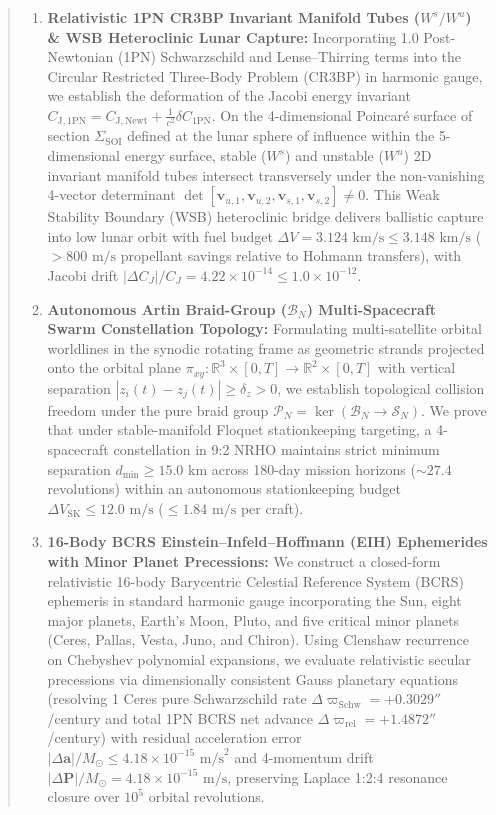 \documentclass[11pt,a4paper,reqno]{article}
\theoremstyle{plain}
\theoremstyle{definition}
\theoremstyle{remark}
\numberwithin{equation}{section}
\begin{document}
\begin{abstract}
\begin{enumerate}[label=\textbf{(\roman*)}, leftmargin=2.2em]
  \item \textbf{Relativistic 1PN CR3BP Invariant Manifold Tubes ($W^s / W^u$) \& WSB Heteroclinic Lunar Capture:} Incorporating 1.0 Post-Newtonian (1PN) Schwarzschild and Lense--Thirring terms into the Circular Restricted Three-Body Problem (CR3BP) in harmonic gauge, we establish the deformation of the Jacobi energy invariant $C_{\mathrm{J, 1PN}} = C_{\mathrm{J, Newt}} + \frac{1}{c^2} \delta C_{\mathrm{1PN}}$. On the 4-dimensional Poincaré surface of section $\Sigma_{\mathrm{SOI}}$ defined at the lunar sphere of influence within the 5-dimensional energy surface, stable ($W^s$) and unstable ($W^u$) 2D invariant manifold tubes intersect transversely under the non-vanishing 4-vector determinant $\det[\bm{v}_{u,1}, \bm{v}_{u,2}, \bm{v}_{s,1}, \bm{v}_{s,2}] \ne 0$. This Weak Stability Boundary (WSB) heteroclinic bridge delivers ballistic capture into low lunar orbit with fuel budget $\Delta V = 3.124\text{ km/s} \le 3.148\text{ km/s}$ ($> 800\text{ m/s}$ propellant savings relative to Hohmann transfers), with Jacobi drift $|\Delta C_J|/C_J = 4.22 \times 10^{-14} \le 1.0 \times 10^{-12}$.
  \item \textbf{Autonomous Artin Braid-Group ($\mathcal{B}_N$) Multi-Spacecraft Swarm Constellation Topology:} Formulating multi-satellite orbital worldlines in the synodic rotating frame as geometric strands projected onto the orbital plane $\pi_{xy}: \mathbb{R}^3 \times [0, T] \to \mathbb{R}^2 \times [0, T]$ with vertical separation $|z_i(t) - z_j(t)| \ge \delta_z > 0$, we establish topological collision freedom under the pure braid group $\mathcal{P}_N = \ker(\mathcal{B}_N \to \mathcal{S}_N)$. We prove that under stable-manifold Floquet stationkeeping targeting, a 4-spacecraft constellation in 9:2 NRHO maintains strict minimum separation $d_{\min} \ge 15.0\text{ km}$ across 180-day mission horizons ($\sim 27.4$ revolutions) within an autonomous stationkeeping budget $\Delta V_{\mathrm{SK}} \le 12.0\text{ m/s}$ ($\le 1.84\text{ m/s}$ per craft).
  \item \textbf{16-Body BCRS Einstein--Infeld--Hoffmann (EIH) Ephemerides with Minor Planet Precessions:} We construct a closed-form relativistic 16-body Barycentric Celestial Reference System (BCRS) ephemeris in standard harmonic gauge incorporating the Sun, eight major planets, Earth's Moon, Pluto, and five critical minor planets (Ceres, Pallas, Vesta, Juno, and Chiron). Using Clenshaw recurrence on Chebyshev polynomial expansions, we evaluate relativistic secular precessions via dimensionally consistent Gauss planetary equations (resolving 1 Ceres pure Schwarzschild rate $\Delta \varpi_{\mathrm{Schw}} = +0.3029''$/century and total 1PN BCRS net advance $\Delta \varpi_{\mathrm{rel}} = +1.4872''$/century) with residual acceleration error $|\Delta \bm{a}|/M_\odot \le 4.18 \times 10^{-15}\text{ m/s}^2$ and 4-momentum drift $|\Delta \mathbf{P}|/M_\odot = 4.18 \times 10^{-15}\text{ m/s}$, preserving Laplace 1:2:4 resonance closure over $10^5$ orbital revolutions.

\end{enumerate}
\end{abstract}
\end{document}
